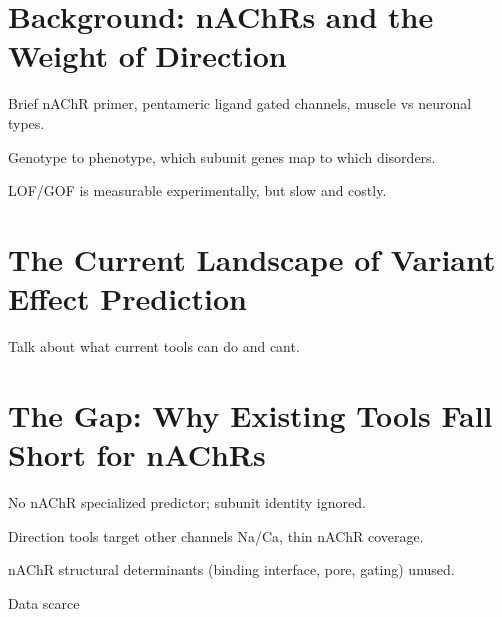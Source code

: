 \documentclass{ws-procs11x85}
\begin{document}
\section{Background: nAChRs and the Weight of Direction}\label{sec:background}
\begin{itemlist}
\item Brief nAChR primer, pentameric ligand gated channels, muscle vs neuronal types.
\item Genotype to phenotype, which subunit genes map to which disorders.
\item LOF/GOF is measurable experimentally, but slow and costly.
\end{itemlist}

\section{The Current Landscape of Variant Effect Prediction}\label{sec:landscape}
\begin{itemlist}
\item Talk about what current tools can do and cant. 
\end{itemlist}


\section{The Gap: Why Existing Tools Fall Short for nAChRs}\label{sec:gap}
\begin{itemlist}
\item No nAChR specialized predictor; subunit identity ignored.
\item Direction tools target other channels Na/Ca, thin nAChR coverage.
\item nAChR structural determinants (binding interface, pore, gating) unused.
\item Data scarce
\end{itemlist}


\end{document}

